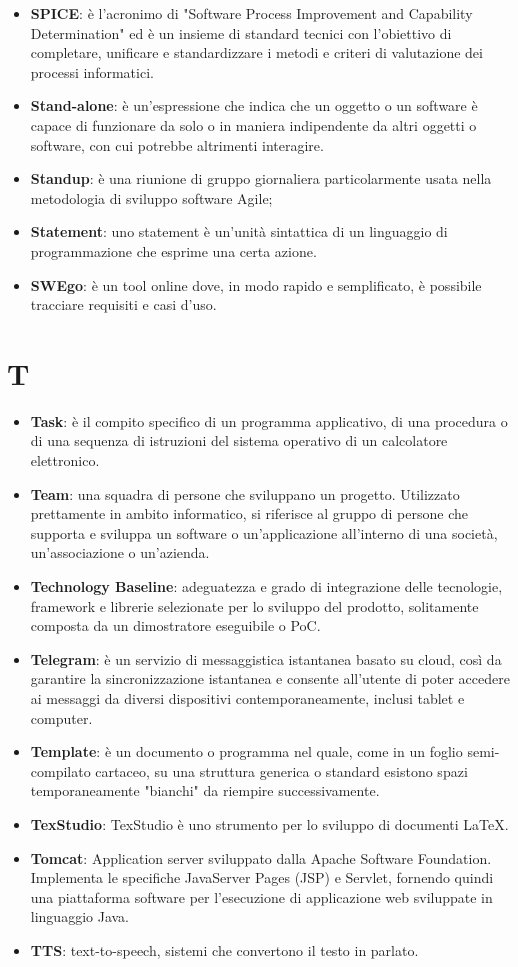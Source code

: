 \documentclass[a4paper, oneside, openany, dvipsnames, table]{article}
\begin{document}
\begin{itemize}
\item \textbf{SPICE}: è l'acronimo di "Software Process Improvement and Capability Determination" ed è un insieme di standard tecnici con l’obiettivo di completare, unificare e standardizzare i metodi e criteri di valutazione dei processi informatici.
\item \textbf{Stand-alone}: è un'espressione che indica che un oggetto o un software è capace di funzionare da solo o in maniera indipendente da altri oggetti o software, con cui potrebbe altrimenti interagire.
\item \textbf{Standup}: è una riunione di gruppo giornaliera particolarmente usata nella metodologia di sviluppo software Agile;
\item \textbf{Statement}: uno statement è un'unità sintattica di un linguaggio di programmazione che esprime una certa azione.
\item \textbf{SWEgo}: è un tool online dove, in modo rapido e semplificato, è possibile tracciare requisiti e casi d'uso.
\end{itemize}

\section{T}
\begin{itemize}
\item \textbf{Task}: è il compito specifico di un programma applicativo, di una procedura o di una sequenza di istruzioni del sistema operativo di un calcolatore elettronico.
\item \textbf{Team}: una squadra di persone che sviluppano un progetto. Utilizzato prettamente in ambito informatico, si riferisce al gruppo di persone che supporta e sviluppa
un software o un’applicazione all’interno di una società, un’associazione o un’azienda.
\item \textbf{Technology Baseline}: adeguatezza e grado di integrazione delle tecnologie, framework e librerie selezionate per lo sviluppo del prodotto, solitamente composta da un dimostratore eseguibile o PoC.
\item \textbf{Telegram}: è un servizio di messaggistica istantanea basato su cloud, così da garantire la sincronizzazione istantanea e consente all'utente di poter accedere ai messaggi da diversi dispositivi contemporaneamente, inclusi tablet e computer.
\item \textbf{Template}: è un documento o programma nel quale, come in un foglio semi-compilato cartaceo, su una struttura generica o standard esistono spazi temporaneamente "bianchi" da riempire successivamente.
\item \textbf{TexStudio}: TexStudio è uno strumento per lo sviluppo di documenti \LaTeX.
\item \textbf{Tomcat}: Application server sviluppato dalla Apache Software Foundation. Implementa le specifiche JavaServer Pages (JSP) e Servlet, fornendo quindi una piattaforma software per l’esecuzione di applicazione web sviluppate in linguaggio Java.
\item \textbf{TTS}: text-to-speech, sistemi che convertono il testo in parlato.
\end{itemize}
\end{document}
